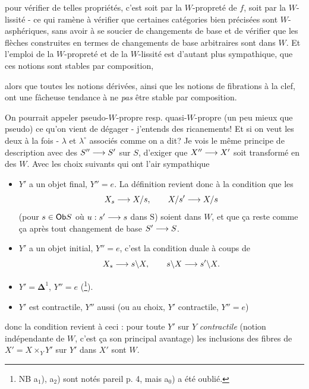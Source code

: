 \leavevmode{}pour vérifier de telles propriétés, c'est soit par la $W$-propreté de $f$, soit par la $W$-lissité - ce qui ramène à vérifier que certaines catégories bien précisées sont $W$-asphériques, sans avoir à se soucier de changements de base et de vérifier que les flèches construites en termes de changements de base arbitraires sont dans $W$. Et l'emploi de la $W$-propreté et de la $W$-lissité est d'autant plus sympathique, que ces notions sont stables par composition,

alors que toutes les notions dérivées, ainsi que les notions de fibrations à la clef, ont une fâcheuse tendance à ne \textit{pas} être stable par composition.

On pourrait appeler pseudo-$W$-propre resp. quasi-$W$-propre (un peu mieux que pseudo) ce qu'on vient de dégager - j'entends des ricanements! Et si on veut les deux à la fois - $\lambda$ et $\lambda^{\circ}$ associés comme on a dit? Je vois le même principe de description avec des $S''\longrightarrow S'$ sur $S$, d'exiger que $X''\longrightarrow X'$ soit transformé en des $W$. Avec les choix suivants qui ont l'air sympathique

\begin{itemize}
\item[a$_1$)] $Y'$ a un objet final, $Y''=e$. La définition revient donc à la condition que les
\[ X_s\longrightarrow X/s, \qquad X/s'\longrightarrow X/s \]
(pour $s\in\mathsf{Ob} S$ où $u : s'\longrightarrow s$ dans $\mathrm{S}$) soient dans $W$, et que ça reste comme ça après tout changement de base $S'\longrightarrow S$.

\item[a$_2$)] $Y'$ a un objet initial, $Y''=e$, c'est la condition duale à coups de
\[ X_s\longrightarrow s\backslash X, \qquad s\backslash X\longrightarrow s'\backslash X. \]

\item[a$_0$)] $Y'=\boldsymbol{\Delta}^1$, $Y''=e$ (\footnote[46]{NB a$_1$), a$_2$) sont notés pareil p. 4, mais a$_0$) a été oublié.}).

\item[b)] $Y'$ est contractile, $Y''$ aussi (ou au choix, $Y'$ contractile, $Y''=e$)
\end{itemize}

donc la condition revient à ceci : pour toute $Y'$ sur $Y$ \textit{contractile} (notion indépendante de $W$, c'est ça son principal avantage) les inclusions des fibres de $X'=X\times_Y Y'$ sur $Y'$ dans $X'$ sont $W$.

